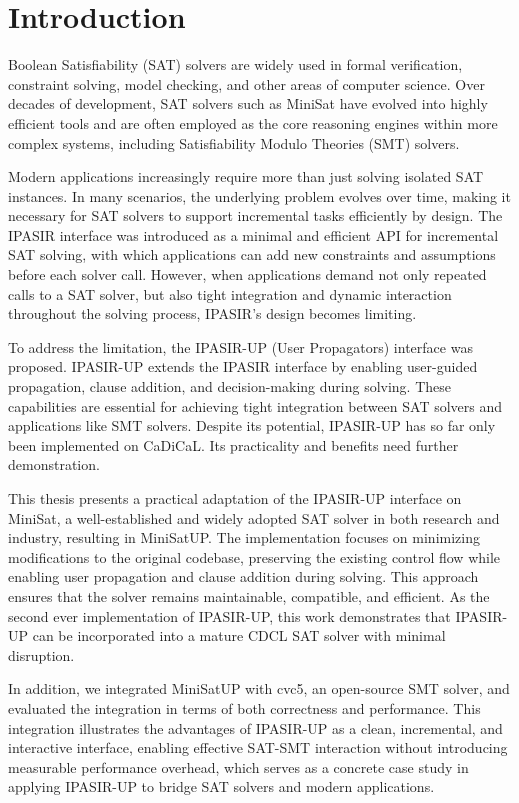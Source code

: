\chapter{Introduction}

Boolean Satisfiability (SAT) solvers are widely used in formal verification, constraint solving, model checking, and other areas of computer science. Over decades of development, SAT solvers such as MiniSat have evolved into highly efficient tools and are often employed as the core reasoning engines within more complex systems, including Satisfiability Modulo Theories (SMT) solvers.

Modern applications increasingly require more than just solving isolated SAT instances. In many scenarios, the underlying problem evolves over time, making it necessary for SAT solvers to support incremental tasks efficiently by design. The IPASIR interface was introduced as a minimal and efficient API for incremental SAT solving, with which applications can add new constraints and assumptions before each solver call. However, when applications demand not only repeated calls to a SAT solver, but also tight integration and dynamic interaction throughout the solving process, IPASIR's design becomes limiting.

To address the limitation, the IPASIR-UP (User Propagators) interface was proposed. IPASIR-UP extends the IPASIR interface by enabling user-guided propagation, clause addition, and decision-making during solving. These capabilities are essential for achieving tight integration between SAT solvers and applications like SMT solvers. Despite its potential, IPASIR-UP has so far only been implemented on CaDiCaL. Its practicality and benefits need further demonstration.

This thesis presents a practical adaptation of the IPASIR-UP interface on MiniSat, a well-established and widely adopted SAT solver in both research and industry, resulting in MiniSatUP. The implementation focuses on minimizing modifications to the original codebase, preserving the existing control flow while enabling user propagation and clause addition during solving. This approach ensures that the solver remains maintainable, compatible, and efficient. As the second ever implementation of IPASIR-UP, this work demonstrates that IPASIR-UP can be incorporated into a mature CDCL SAT solver with minimal disruption.

In addition, we integrated MiniSatUP with cvc5, an open-source SMT solver, and evaluated the integration in terms of both correctness and performance. This integration illustrates the advantages of IPASIR-UP as a clean, incremental, and interactive interface, enabling effective SAT-SMT interaction without introducing measurable performance overhead, which serves as a concrete case study in applying IPASIR-UP to bridge SAT solvers and modern applications.

